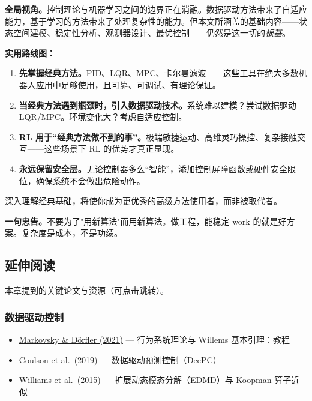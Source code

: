 \begin{mdframed}
\textbf{全局视角。}\;控制理论与机器学习之间的边界正在消融。数据驱动方法带来了自适应能力，基于学习的方法带来了处理复杂性的能力。但本文所涵盖的基础内容------状态空间建模、稳定性分析、观测器设计、最优控制------仍然是这一切的\emph{根基}。

\textbf{实用路线图：}
\begin{enumerate}[nosep]
    \item \textbf{先掌握经典方法。}PID、LQR、MPC、卡尔曼滤波------这些工具在绝大多数机器人应用中足够使用，且可靠、可调试、有理论保证。
    \item \textbf{当经典方法遇到瓶颈时，引入数据驱动技术。}系统难以建模？尝试数据驱动 LQR/MPC。环境变化大？考虑自适应控制。
    \item \textbf{RL 用于``经典方法做不到的事''。}极端敏捷运动、高维灵巧操控、复杂接触交互------这些场景下 RL 的优势才真正显现。
    \item \textbf{永远保留安全层。}无论控制器多么``智能''，添加控制屏障函数或硬件安全限位，确保系统不会做出危险动作。
\end{enumerate}

深入理解经典基础，将使你成为更优秀的高级方法使用者，而非被取代者。

\textbf{一句忠告。}\;不要为了"用新算法"而用新算法。做工程，能稳定 work 的就是好方案。复杂度是成本，不是功绩。
\end{mdframed}

\subsection{延伸阅读}

本章提到的关键论文与资源（可点击跳转）。

\subsubsection*{数据驱动控制}
\begin{itemize}[nosep]
    \item \href{https://arxiv.org/abs/2206.00397}{Markovsky \& Dörfler (2021)} --- 行为系统理论与 Willems 基本引理：教程
    \item \href{https://arxiv.org/abs/1811.05890}{Coulson et al.\ (2019)} --- 数据驱动预测控制（DeePC）
    \item \href{https://arxiv.org/abs/1408.4408}{Williams et al.\ (2015)} --- 扩展动态模态分解（EDMD）与 Koopman 算子近似
\end{itemize}

